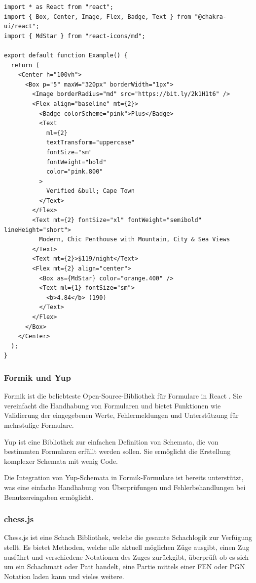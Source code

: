 \documentclass[a4paper,12pt]{report}
\newcommand{\footcite}[1]{\footnotemark\footnotetext{\cite{#1}}}
\begin{document}
\begin{lstlisting}[style=codeStyle, caption={Beispiel mit Chakra UI designten React Komponente (siehe Abbildung  \textbf{Quelle: } \cite{chakraui}}, label={lst:chakra-example}]
import * as React from "react";
import { Box, Center, Image, Flex, Badge, Text } from "@chakra-ui/react";
import { MdStar } from "react-icons/md";

export default function Example() {
  return (
    <Center h="100vh">
      <Box p="5" maxW="320px" borderWidth="1px">
        <Image borderRadius="md" src="https://bit.ly/2k1H1t6" />
        <Flex align="baseline" mt={2}>
          <Badge colorScheme="pink">Plus</Badge>
          <Text
            ml={2}
            textTransform="uppercase"
            fontSize="sm"
            fontWeight="bold"
            color="pink.800"
          >
            Verified &bull; Cape Town
          </Text>
        </Flex>
        <Text mt={2} fontSize="xl" fontWeight="semibold" lineHeight="short">
          Modern, Chic Penthouse with Mountain, City & Sea Views
        </Text>
        <Text mt={2}>$119/night</Text>
        <Flex mt={2} align="center">
          <Box as={MdStar} color="orange.400" />
          <Text ml={1} fontSize="sm">
            <b>4.84</b> (190)
          </Text>
        </Flex>
      </Box>
    </Center>
  );
}
\end{lstlisting}
        \subsubsection{Formik und Yup}
        \label{sec:formik}
Formik ist die beliebteste Open-Source-Bibliothek für Formulare in React \footcite{formik}. Sie vereinfacht die Handhabung von Formularen und bietet Funktionen wie Validierung der eingegebenen Werte, Fehlermeldungen und Unterstützung für mehrstufige Formulare.

Yup ist eine Bibliothek  zur einfachen Definition von Schemata, die von bestimmten Formularen erfüllt werden sollen. Sie ermöglicht die Erstellung komplexer Schemata mit wenig Code\footcite{Yup}.

Die Integration von Yup-Schemata in Formik-Formulare ist bereits unterstützt, was eine einfache Handhabung von Überprüfungen und Fehlerbehandlungen bei Benutzereingaben ermöglicht.

        \subsubsection{chess.js}
        \label{sec:chess.js}
Chess.js ist eine Schach Bibliothek, welche die gesamte Schachlogik zur Verfügung stellt\footcite{chess.js}. Es bietet Methoden, welche alle aktuell möglichen Züge ausgibt, einen Zug ausführt und verschiedene Notationen des Zuges zurückgibt, überprüft ob es sich um ein Schachmatt oder Patt handelt, eine Partie mittels einer FEN\footcite{FEN} oder PGN\footcite{PGN} Notation laden kann und vieles weitere. 
\end{document}

